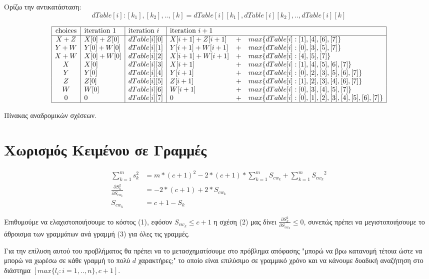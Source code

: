 \documentclass[a4paper,10pt]{article} \usepackage{anysize}
\begin{document}
Ορίζω την αντικατάσταση:
\[
	dTable[i]:[k_1],[k_2],..,[k] = dTable[i][k_1],dTable[i][k_2],..,dTable[i][k]
\]
\begin{table}[h]
\[
\begin{array}{| c | l | l | l  c  l |}
\hline
\text{choices}&\text{iteration }1 & \text{iteration }i&\text{iteration }i+1&&\\
\hline
X+Z&X[0]+Z[0] &dTable[i][0]&X[i+1]+Z[i+1]&+&max\{dTable[i]:[1],[4],[6],[7]\} 
\\
Y+W&Y[0]+W[0] &dTable[i][1]&Y[i+1]+W[i+1]&+&max\{dTable[i]:[0],[3],[5],[7]\}  
\\
X+W&X[0]+W[0] &dTable[i][2]&X[i+1]+W[i+1]&+&max\{dTable[i]:[4],[5],[7]\} 
\\
X&X[0] &dTable[i][3]&X[i+1]&+&max\{dTable[i]:[1],[4],[5],[6],[7]\} 
\\
Y&Y[0] &dTable[i][4]&Y[i+1]&+&max\{dTable[i]:[0],[2],[3],[5],[6],[7]\} 
\\
Z&Z[0] &dTable[i][5]&Z[i+1]&+&max\{dTable[i]:[1],[2],[3],[4],[6],[7]\} 
\\
W&W[0] &dTable[i][6]&W[i+1]&+&max\{dTable[i]:[0],[3],[4],[5],[7]\} 
\\
0&0 &dTable[i][7]&0&+&max\{dTable[i]:[0],[1],[2],[3],[4],[5],[6],[7]\} 
\\
\hline
\end{array}
\]
\caption{Πίνακας αναδρομικών σχέσεων.}
\end{table}

\section{Χωρισμός Κειμένου σε Γραμμές}
\begin{align}
	\sum_{k=1}^{m}{s_{k}^2} & =
	m*(c+1)^2-2*(c+1)*\sum_{k=1}^m{S_{cw_{k} }}+\sum_{k=1}^m{{S_{cw_{k} }}^2}\\
	\frac{\partial{S_k^2}}{\partial{S_{cw_k} }}&=-2*(c+1)+2*S_{cw_k}\\
	S_{cw_k} & =  c+1-S_k 
\end{align}

Επιθυμούμε να ελαχιστοποιήσουμε το κόστος (1), εφόσον $S_{cw_k} \le c+1$ η
σχέση (2) μας δίνει $\frac{\partial{S_k^2}}{\partial{S_{cw_k} }} \le 0 $, συνεπώς 
πρέπει να μεγιστοποιήσουμε το άθροισμα των γραμμάτων ανά γραμμή (3) 
για όλες τις γραμμές.

Για την επίλυση αυτού του προβλήματος θα πρέπει να το μετασχηματίσουμε στο
πρόβλημα απόφασης "μπορώ να βρω κατανομή τέτοια ώστε να μπορώ να χωρέσω σε
κάθε γραμμή το πολύ $d$ χαρακτήρες;" το οποίο είναι επιλύσιμο σε γραμμικό
χρόνο και να κάνουμε δυαδική αναζήτηση στο διάστημα $[max\{l_i:i=1,..,n\},c+1]$.
\end{document}

